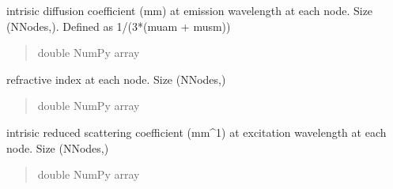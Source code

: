 \documentclass[letterpaper,10pt,english]{sphinxmanual}
\begin{document}
\begin{fulllineitems}
\begin{fulllineitems}
\begin{quote}
\begin{description}
\end{description}\end{quote}

\end{fulllineitems}


\begin{fulllineitems}
\label{\detokenize{_autosummary/nirfasterff.base.fluor_mesh.fluormesh:nirfasterff.base.fluor_mesh.fluormesh.kappam}}
\pysigstartsignatures
\pysigline
{}
\pysigstopsignatures
\sphinxAtStartPar
intrisic diffusion coefficient (mm) at emission wavelength at each node. Size (NNodes,). Defined as 1/(3*(muam + musm))
\begin{quote}\begin{description}
\sphinxAtStartPar
double NumPy array

\end{description}\end{quote}

\end{fulllineitems}


\begin{fulllineitems}
\label{\detokenize{_autosummary/nirfasterff.base.fluor_mesh.fluormesh:nirfasterff.base.fluor_mesh.fluormesh.ri}}
\pysigstartsignatures
\pysigline
{}
\pysigstopsignatures
\sphinxAtStartPar
refractive index at each node. Size (NNodes,)
\begin{quote}\begin{description}
\sphinxAtStartPar
double NumPy array

\end{description}\end{quote}

\end{fulllineitems}


\begin{fulllineitems}
\label{\detokenize{_autosummary/nirfasterff.base.fluor_mesh.fluormesh:nirfasterff.base.fluor_mesh.fluormesh.musx}}
\pysigstartsignatures
\pysigline
{}
\pysigstopsignatures
\sphinxAtStartPar
intrisic reduced scattering coefficient (mm\textasciicircum{}\sphinxhyphen{}1) at excitation wavelength at each node. Size (NNodes,)
\begin{quote}\begin{description}
\sphinxAtStartPar
double NumPy array


\end{description}
\end{quote}
\end{fulllineitems}
\end{fulllineitems}
\end{document}
